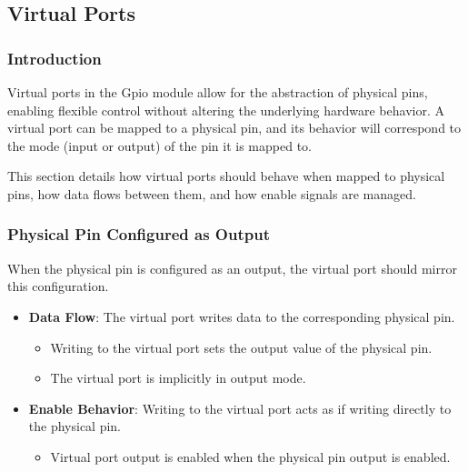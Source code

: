 \subsection{Virtual Ports}

\subsubsection{Introduction}
Virtual ports in the Gpio module allow for the abstraction of physical pins, enabling flexible control without altering the underlying hardware behavior. A virtual port can be mapped to a physical pin, and its behavior will correspond to the mode (input or output) of the pin it is mapped to.

This section details how virtual ports should behave when mapped to physical pins, how data flows between them, and how enable signals are managed.

\subsubsection{Physical Pin Configured as Output}
When the physical pin is configured as an output, the virtual port should mirror this configuration.

\begin{itemize}[noitemsep]
    \item \textbf{Data Flow}: The virtual port writes data to the corresponding physical pin.
    \begin{itemize}[noitemsep]
        \item Writing to the virtual port sets the output value of the physical pin.
        \item The virtual port is implicitly in output mode.
    \end{itemize}
    \item \textbf{Enable Behavior}: Writing to the virtual port acts as if writing directly to the physical pin.
    \begin{itemize}[noitemsep]
        \item Virtual port output is enabled when the physical pin output is enabled.
    \end{itemize}
\end{itemize}


